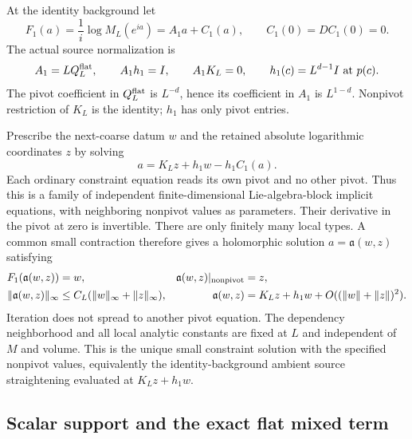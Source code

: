 At the identity background let
\begin{equation}
 F_1(a)=\frac1i\log M_L(e^{ia})=A_1a+C_1(a),\qquad
 C_1(0)=DC_1(0)=0.                                           \label{st-constraint}
\end{equation}
The actual source normalization is
\begin{equation}
 A_1=LQ_L^{\rm flat},\qquad A_1h_1=I,\qquad A_1K_L=0,
 \qquad h_1(c)=L^{d-1}I\text{ at }p(c).                       \label{st-pivot-normalization}
\end{equation}
The pivot coefficient in $Q_L^{\rm flat}$ is $L^{-d}$, hence its
coefficient in $A_1$ is $L^{1-d}$. Nonpivot restriction of $K_L$ is the
identity; $h_1$ has only pivot entries.

Prescribe the next-coarse datum $w$ and the retained absolute logarithmic
coordinates $z$ by solving
\begin{equation}
 a=K_Lz+h_1w-h_1C_1(a).                                     \label{st-affine-equation}
\end{equation}
Each ordinary constraint equation reads its own pivot and no other
pivot. Thus this is a family of independent finite-dimensional
Lie-algebra-block implicit equations, with neighboring nonpivot values
as parameters. Their derivative in the pivot at zero is invertible.
There are only finitely many local types. A common small contraction
therefore gives a holomorphic solution $a=\mathfrak a(w,z)$ satisfying
\begin{align}
 F_1(\mathfrak a(w,z))&=w,&
 \mathfrak a(w,z)|_{\rm nonpivot}&=z,\notag\\
 \|\mathfrak a(w,z)\|_\infty
    &\le C_L(\|w\|_\infty+\|z\|_\infty),&
 \mathfrak a(w,z)&=K_Lz+h_1w+O((\|w\|+\|z\|)^2).
                                                               \label{st-affine-bounds}
\end{align}
Iteration does not spread to another pivot equation. The dependency
neighborhood and all local analytic constants are fixed at $L$ and
independent of $M$ and volume. This is the unique small constraint
solution with the specified nonpivot values, equivalently the
identity-background ambient source straightening evaluated at
$K_Lz+h_1w$.

\subsection{Scalar support and the exact flat mixed term}
\label{st-scalar-section}

